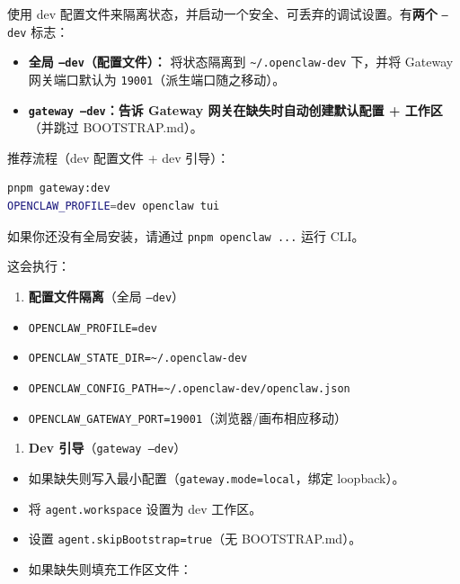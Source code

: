 使用 dev 配置文件来隔离状态，并启动一个安全、可丢弃的调试设置。有\textbf{两个} \texttt{--dev} 标志：

\begin{itemize}
  \item \textbf{全局 \texttt{--dev}（配置文件）：} 将状态隔离到 \texttt{\textasciitilde{}/.openclaw-dev} 下，并将 Gateway 网关端口默认为 \texttt{19001}（派生端口随之移动）。
  \item \textbf{\texttt{gateway --dev}：告诉 Gateway 网关在缺失时自动创建默认配置 + 工作区}（并跳过 BOOTSTRAP.md）。
\end{itemize}


推荐流程（dev 配置文件 + dev 引导）：

\begin{lstlisting}[language=bash]
pnpm gateway:dev
OPENCLAW_PROFILE=dev openclaw tui
\end{lstlisting}


如果你还没有全局安装，请通过 \texttt{pnpm openclaw ...} 运行 CLI。

这会执行：

\begin{enumerate}
  \item \textbf{配置文件隔离}（全局 \texttt{--dev}）
\end{enumerate}

\begin{itemize}
  \item \texttt{OPENCLAW\_PROFILE=dev}
  \item \texttt{OPENCLAW\_STATE\_DIR=\textasciitilde{}/.openclaw-dev}
  \item \texttt{OPENCLAW\_CONFIG\_PATH=\textasciitilde{}/.openclaw-dev/openclaw.json}
  \item \texttt{OPENCLAW\_GATEWAY\_PORT=19001}（浏览器/画布相应移动）
\end{itemize}


\begin{enumerate}
  \item \textbf{Dev 引导}（\texttt{gateway --dev}）
\end{enumerate}

\begin{itemize}
  \item 如果缺失则写入最小配置（\texttt{gateway.mode=local}，绑定 loopback）。
  \item 将 \texttt{agent.workspace} 设置为 dev 工作区。
  \item 设置 \texttt{agent.skipBootstrap=true}（无 BOOTSTRAP.md）。
  \item 如果缺失则填充工作区文件：
\end{itemize}


